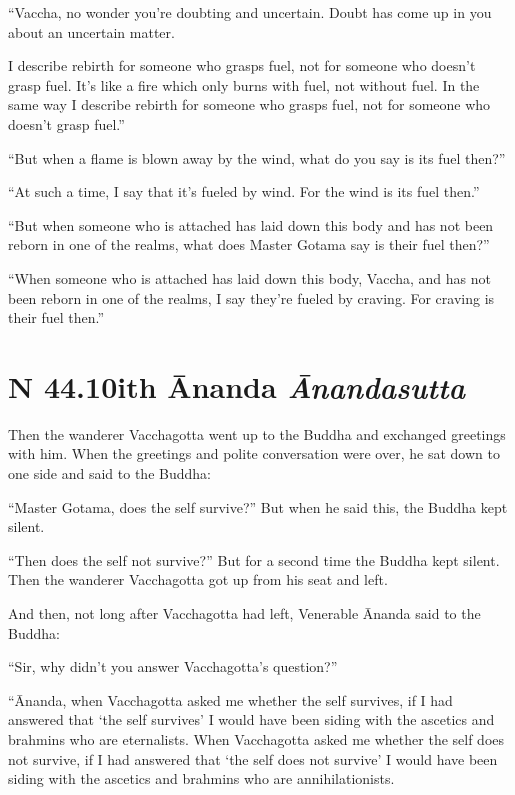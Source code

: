 \documentclass[12pt,openany]{book}%
\newcommand*{\suttatitleacronym}[1]{\smaller[2]{#1}\vspace*{.3em}}
\newcommand*{\suttatitletranslation}[1]{\linebreak{#1}}
\newcommand*{\suttatitleroot}[1]{\linebreak\smaller[2]\itshape{#1}}
\newcommand*{\tocacronym}[1]{\hspace*{-3.3em}{#1}\quad}
\newcommand*{\toctranslation}[1]{#1}
\newcommand*{\tocroot}[1]{(\textit{#1})}
\begin{document}
“Vaccha, no wonder you’re doubting and uncertain. Doubt has come up in you about an uncertain matter. 

I describe rebirth for someone who grasps fuel, not for someone who doesn’t grasp fuel. It’s like a fire which only burns with fuel, not without fuel. In the same way I describe rebirth for someone who grasps fuel, not for someone who doesn’t grasp fuel.” 

“But when a flame is blown away by the wind, what do you say is its fuel then?” 

“At such a time, I say that it’s fueled by wind. For the wind is its fuel then.” 

“But when someone who is attached has laid down this body and has not been reborn in one of the realms, what does Master Gotama say is their fuel then?” 

“When someone who is attached has laid down this body, Vaccha, and has not been reborn in one of the realms, I say they’re fueled by craving. For craving is their fuel then.” 

%
\section*{{\suttatitleacronym SN 44.10}{\suttatitletranslation With Ānanda }{\suttatitleroot Ānandasutta}}
\addcontentsline{toc}{section}{\tocacronym{SN 44.10} \toctranslation{With Ānanda } \tocroot{Ānandasutta}}

Then the wanderer Vacchagotta went up to the Buddha and exchanged greetings with him. When the greetings and polite conversation were over, he sat down to one side and said to the Buddha: 

“Master Gotama, does the self survive?” But when he said this, the Buddha kept silent. 

“Then does the self not survive?” But for a second time the Buddha kept silent. Then the wanderer Vacchagotta got up from his seat and left. 

And then, not long after Vacchagotta had left, Venerable Ānanda said to the Buddha: 

“Sir, why didn’t you answer Vacchagotta’s question?” 

“Ānanda, when Vacchagotta asked me whether the self survives, if I had answered that ‘the self survives’ I would have been siding with the ascetics and brahmins who are eternalists. When Vacchagotta asked me whether the self does not survive, if I had answered that ‘the self does not survive’ I would have been siding with the ascetics and brahmins who are annihilationists. 
\end{document}
